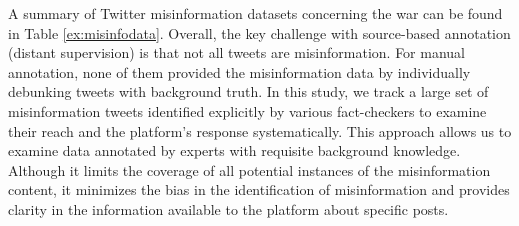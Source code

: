 
A summary of Twitter misinformation datasets concerning the war can be found in Table \ref{ex:misinfodata}. 
Overall, the key challenge with source-based annotation (distant supervision) is that not all tweets are misinformation. 
For manual annotation, none of them provided the misinformation data by individually debunking tweets with background truth. 
In this study, we track a large set of misinformation tweets identified explicitly by various fact-checkers to examine their reach and the platform's response systematically. This approach allows us to examine data annotated by experts with requisite background knowledge. 
Although it limits the coverage of all potential instances of the misinformation content, it minimizes the bias in the identification of misinformation and provides clarity in the information available to the platform about specific posts. 


